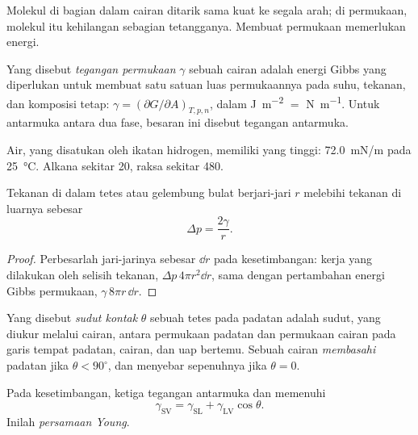 Molekul di bagian dalam cairan ditarik sama kuat ke segala arah; di permukaan,
molekul itu kehilangan sebagian tetangganya. Membuat permukaan memerlukan energi.

\begin{definition}\label{def:b3:colloids:surface-tension}
Yang disebut \emph{tegangan permukaan} $\gamma$ sebuah cairan adalah energi
Gibbs yang diperlukan untuk membuat satu satuan luas permukaannya pada suhu,
tekanan, dan komposisi tetap: $\gamma = (\partial G/\partial A)_{T,p,n}$, dalam \unit{J.m^{-2}} $=$ \unit{N.m^{-1}}. Untuk
antarmuka antara dua fase, besaran ini disebut tegangan antarmuka.
\end{definition}

Air, yang disatukan oleh ikatan hidrogen, memiliki  yang tinggi: \qty{72.0}{mN/m}
pada \qty{25}{\celsius}. Alkana sekitar 20, raksa sekitar 480.

\begin{proposition}\label{prop:b3:colloids:laplace}
Tekanan di dalam tetes atau gelembung bulat berjari-jari $r$ melebihi tekanan
di luarnya sebesar
\[
  \Delta p = \frac{2\gamma}{r} .
\]
\end{proposition}

\begin{proof}
Perbesarlah jari-jarinya sebesar $\dd r$ pada kesetimbangan: kerja yang dilakukan oleh selisih
tekanan, $\Delta p\,4\pi r^2\dd r$, sama dengan pertambahan energi Gibbs permukaan, $\gamma\,8\pi r\,\dd r$.
\end{proof}

\begin{definition}\label{def:b3:colloids:wetting}
Yang disebut \emph{sudut kontak} $\theta$ sebuah tetes pada padatan adalah sudut,
yang diukur melalui cairan, antara permukaan padatan dan permukaan cairan
pada garis tempat padatan, cairan, dan uap bertemu. Sebuah cairan
\emph{membasahi} padatan jika $\theta < 90^\circ$, dan menyebar sepenuhnya jika $\theta = 0$.
\end{definition}

\begin{theorem}\label{thm:b3:colloids:young}
Pada kesetimbangan, ketiga tegangan antarmuka dan  memenuhi
\[
  \gamma_{\mathrm{SV}} = \gamma_{\mathrm{SL}} + \gamma_{\mathrm{LV}}\cos\theta .
\]
Inilah \emph{persamaan Young}.
\end{theorem}

